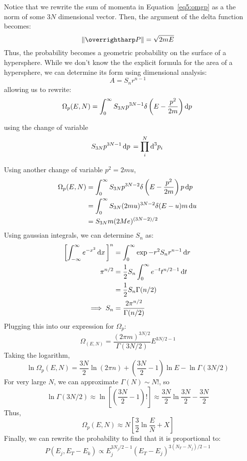 Notice that we rewrite the sum of momenta in Equation~\ref{eq5:omgp} as a the norm of some \(3N\) dimensional vector. Then, the argument of the delta function becomes:
\begin{equation}
	\norm{\vv{P}}=\sqrt{2mE}
\end{equation}
Thus, the probability becomes a geometric probability on the surface of a hypersphere. While we don't know the the explicit formula for the area of a hypersphere, we can determine its form using dimensional analysis:
\[A=S_n r^{n-1}\]
allowing us to rewrite:
\begin{equation}
	\Omega_p(E,N)=\int_0^\infty S_{3N} p^{3N-1}\delta\left(E-\frac{p^2}{2m}\right)\d{p}
\end{equation}

using the change of variable
\[S_{3N}p^{3N-1}\d{p}=\prod_i^{N}\d[3]{p_i}\]

Using another change of variable \(p^2=2mu\),
\begin{align*}
	\Omega_p(E,N)&=\int_0^\infty S_{3N}p^{3N-2}\delta\left(E-\frac{p^2}{2m}\right)p\d{p}\\
		     &=\int_0^\infty S_{3N}(2mu)^{3N-2}\delta(E-u)m\d{u}\\
		     &=S_{3N}m(2Me)^{(3N-2)/2}
\end{align*}
Using gaussian integrals, we can determine \(S_n\) as:
\begin{align}
	\left[\int_{-\infty}^\infty e^{-x^2}\d{x}\right]^n&=\int_0^\infty\exp{-r^2}S_nr^{n-1}\d{r}\nonumber\\
	 \pi^{n/2}&=\frac{1}{2}S_n\int_0^\infty e^{-t}t^{n/2-1}\d{t}\nonumber\\
		  &=\frac{1}{2}S_n\Gamma(n/2)\nonumber\\
	 \then S_n&=\frac{2\pi^{n/2}}{\Gamma(n/2)}
\end{align}
Plugging this into our expression for \(\Omega_p\):
\begin{equation}
	\Omega_(E,N)=\frac{(2\pi m)^{3N/2}}{\Gamma(3N/2)}E^{3N/2-1}
\end{equation}
Taking the logarithm,
\begin{equation}
	\ln\Omega_p(E,N)=\frac{3N}{2}\ln(2\pi n)+\left(\frac{3N}{2}-1\right)\ln E-\ln\Gamma(3N/2)
\end{equation}
For very large \(N\), we can approximate \(\Gamma(N)\sim N! \), so
\[\ln\Gamma(3N/2)\approx\ln\left[\left(\frac{3N}{2}-1\right)!\right]\approx\frac{3N}{2}\ln\frac{3N}{2}-\frac{3N}{2}\]
Thus,
\[\Omega_p(E,N)\approx N\left[\frac{3}{2}\ln\frac{E}{N}+X\right]\]
Finally, we can rewrite the probability to find that it is proportional to:
\begin{equation}
	P(E_j, E_T-E_k)\propto E_j^{3N_j/2-1}(E_T-E_j)^{3(N_T-N_j)/2-1}
\end{equation}

